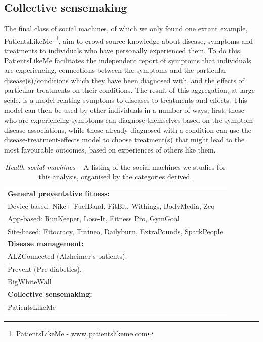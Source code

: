 \documentclass{sig-alternate}
\begin{document}
\subsection{Collective sensemaking}
The final class of social machines, of which we only found one extant
example, PatientsLikeMe~\footnote{PatientsLikeMe -
  \url{www.patientslikeme.com}}, aim to crowd-source knowledge about
disease, symptoms and treatments to individuals who have personally
experienced them.  To do this, PatientsLikeMe facilitates the
independent report of symptoms that individuals are experiencing,
connections between the symptoms and the particular
disease(s)/conditions which they have been diagnosed with, and the
effects of particular treatments on their conditions.  The result of
this aggregation, at large scale, is a model relating symptoms to
diseases to treatments and effects.  This model can then be used by
other individuals in a number of ways; first, those who are
experiencing symptoms can diagnose themselves based on the
symptom-disease associations, while those already diagnosed with
a condition can use the disease-treatment-effects model to choose
treatment(s) that might lead to the most favourable outcomes, based on experiences of
others like them.

\begin{table}[htb]
\begin{center}
\begin{tabular}{|p{8cm}|}
\hline
{\bf General preventative fitness:} \\
Device-based: Nike+ FuelBand, FitBit, Withings, BodyMedia, Zeo \\
App-based: RunKeeper, Lose-It, Fitness Pro, GymGoal \\
Site-based: Fitocracy, Traineo, Dailyburn, ExtraPounds, SparkPeople  \\
\hline
{\bf Disease management:} \\
ALZConnected (Alzheimer's patients),  \\
Prevent (Pre-diabetics), \\
BigWhiteWall \\
\hline
{\bf Collective sensemaking:} \\
PatientsLikeMe \\
\hline
\end{tabular}
\end{center}
\caption{\emph{Health social machines} -- A listing of the social
  machines we studies for this analysis, organised by the categories
  derived.} \label{table:clusters}
\end{table}
\end{document}
